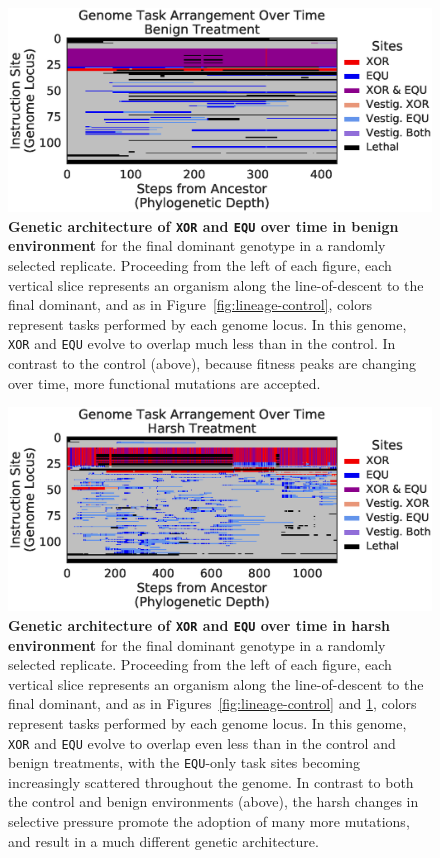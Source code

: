 \documentclass[10pt,letterpaper,final]{article}
\begin{document}
	\begin{figure}[!h]
	\includegraphics[width=0.95\columnwidth]{figures/CE/fig7.eps}
	\caption{\textbf{Genetic architecture of \texttt{XOR} and \texttt{EQU} over time in benign environment} for the final dominant genotype in a randomly selected replicate. Proceeding from the left of each figure, each vertical slice represents an organism along the line-of-descent to the final dominant, and as in Figure~\ref{fig:lineage-control}, colors represent tasks performed by each genome locus. In this genome, \texttt{XOR} and \texttt{EQU} evolve to overlap much less than in the control.  In contrast to the control (above), because fitness peaks are changing over time, more functional mutations are accepted.}
	\label{fig:lineage-benign}
	\end{figure}

	\begin{figure}[!h]
	\includegraphics[width=0.95\columnwidth]{figures/CE/fig8.eps}
	\caption{\textbf{Genetic architecture of \texttt{XOR} and \texttt{EQU} over time in harsh environment} for the final dominant genotype in a randomly selected replicate. Proceeding from the left of each figure, each vertical slice represents an organism along the line-of-descent to the final dominant, and as in Figures~\ref{fig:lineage-control} and \ref{fig:lineage-benign}, colors represent tasks performed by each genome locus. In this genome, \texttt{XOR} and \texttt{EQU} evolve to overlap even less than in the control and benign treatments, with the \texttt{EQU}-only task sites becoming increasingly scattered throughout the genome. In contrast to both the control and benign environments (above), the harsh changes in selective pressure promote the adoption of many more mutations, and result in a much different genetic architecture.}
	\label{fig:lineage-harsh}
	\end{figure}
\end{document}
